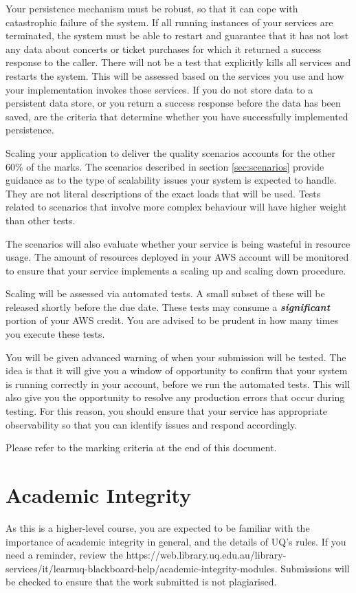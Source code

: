 \documentclass{csse4400}
\begin{document}
Your persistence mechanism must be robust, so that it can cope with catastrophic failure of the system.
If all running instances of your services are terminated,
the system must be able to restart and guarantee that it has not lost any data about concerts or ticket purchases
for which it returned a success response to the caller.
There will not be a test that explicitly kills all services and restarts the system.
This will be assessed based on the services you use and how your implementation invokes those services.
If you do not store data to a persistent data store,
or you return a success response before the data has been saved,
are the criteria that determine whether you have successfully implemented persistence.

Scaling your application to deliver the quality scenarios accounts for the other 60\% of the marks.
The scenarios described in section \ref{sec:scenarios} provide guidance as to the type of scalability issues your system is expected to handle.
They are not literal descriptions of the exact loads that will be used.
Tests related to scenarios that involve more complex behaviour will have higher weight than other tests.

The scenarios will also evaluate whether your service is being wasteful in resource usage.
The amount of resources deployed in your AWS account will be monitored to ensure that your service implements a scaling up and scaling down procedure.

Scaling will be assessed via automated tests.
A small subset of these will be released shortly before the due date.
These tests may consume a \textbf{\emph{significant}} portion of your AWS credit.
You are advised to be prudent in how many times you execute these tests.

You will be given advanced warning of when your submission will be tested.
The idea is that it will give you a window of opportunity to confirm that your system is running correctly in your account,
before we run the automated tests.
This will also give you the opportunity to resolve any production errors that occur during testing.
For this reason,
you should ensure that your service has appropriate observability so that you can identify issues and respond accordingly.

Please refer to the marking criteria at the end of this document.


\section{Academic Integrity}
As this is a higher-level course, you are expected to be familiar with the importance of academic integrity in general, and the details of UQ's rules.
If you need a reminder, review the 
{https://web.library.uq.edu.au/library-services/it/learnuq-blackboard-help/academic-integrity-modules}.
Submissions will be checked to ensure that the work submitted is not plagiarised.
\end{document}
